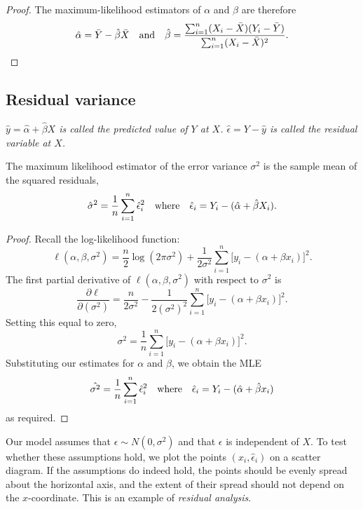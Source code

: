 \begin{proof}
The maximum-likelihood estimators of $\alpha$ and $\beta$ are therefore
\[
\hat{\alpha} = \bar{Y}-\hat{\beta}\bar{X}
\text{\quad and\quad}
\hat{\beta} = \frac{\sum_{i=1}^n (X_i-\bar{X})(Y_i-\bar{Y})}{\sum_{i=1}^n (X_i-\bar{X})^2}.
\]
\end{proof}

\subsection{Residual variance}

\begin{definition}

\ben
\it $\hat{y} = \hat{\alpha} + \hat{\beta}X$ is called the \emph{predicted value of $Y$} at $X$.
\it $\hat{\epsilon} = Y - \hat{y}$ is called the \emph{residual variable} at $X$.
\een
\end{definition}

\begin{theorem}
The maximum likelihood estimator of the error variance $\sigma^2$ is the sample mean of the squared residuals,
\[
\hat{\sigma}^2 = \frac{1}{n}\sum_{i=1}^n \hat{\epsilon}_i^2 
\text{\quad where\quad} 
\hat{\epsilon}_i = Y_i-(\hat{\alpha}+\hat{\beta} X_i).
\]
\end{theorem}

\begin{proof}
Recall the log-likelihood function:
\[
\ell(\alpha,\beta,\sigma^2)
	= \frac{n}{2}\log(2\pi\sigma^2) + \frac{1}{2\sigma^2}\sum_{i=1}^n \big[y_i-(\alpha+\beta x_i)\big]^2.
\]
The first partial derivative of $\ell(\alpha,\beta,\sigma^2)$ with respect to $\sigma^2$ is
\[
\frac{\partial\ell}{\partial(\sigma^2)} 
	= \frac{n}{2\sigma^2} - \frac{1}{2(\sigma^2)^2}\sum_{i=1}^n \big[y_i-(\alpha+\beta x_i)\big]^2.
\]
Setting this equal to zero,
\[
\sigma^2 = \frac{1}{n}\sum_{i=1}^n \big[y_i-(\alpha+\beta x_i)\big]^2.
\]
Substituting our estimates for $\alpha$ and $\beta$, we obtain the MLE
\[
\hat{\sigma^2} = \frac{1}{n}\sum_{i=1}^n \hat{\epsilon}_i^2 \text{\quad where\quad} \hat{\epsilon}_i = Y_i-(\hat{\alpha}+\hat{\beta} x_i)
\]
as required.

\end{proof}

\begin{remark}
Our model assumes that $\epsilon\sim N(0,\sigma^2)$ and that $\epsilon$ is independent of $X$. To test whether these assumptions hold, we plot the points $(x_i,\hat{\epsilon}_i)$ on a scatter diagram. If the assumptions do indeed hold, the points should be evenly spread about the horizontal axis, and the extent of their spread should not depend on the $x$-coordinate. 
This is an example of \emph{residual analysis}. 
\end{remark}

